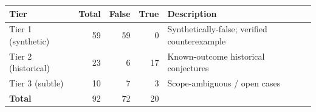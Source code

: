 \begin{tabular}{lrrrl}
\toprule
\textbf{Tier} & \textbf{Total} & \textbf{False} & \textbf{True} & \textbf{Description} \\
\midrule
Tier 1 (synthetic)   & 59 & 59 & 0  & Synthetically-false; verified counterexample \\
Tier 2 (historical)  & 23 &  6 & 17 & Known-outcome historical conjectures \\
Tier 3 (subtle)      & 10 &  7 &  3 & Scope-ambiguous / open cases \\
\midrule
\textbf{Total}       & 92 & 72 & 20 & \\
\bottomrule
\end{tabular}
